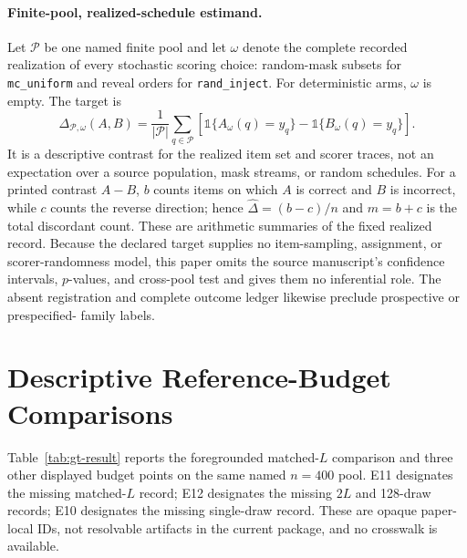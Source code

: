 \documentclass{article}
\newcommand{\rinj}{\texttt{rand\_inject}}
\newcommand{\mcu}{\texttt{mc\_uniform}}
\newcommand{\II}{\mathbb{1}}
\begin{document}
\paragraph{Finite-pool, realized-schedule estimand.}
Let $\mathcal P$ be one named finite pool and let $\omega$ denote the complete
recorded realization of every stochastic scoring choice: random-mask subsets
for \mcu{} and reveal orders for \rinj{}.  For deterministic arms, $\omega$ is
empty.  The target is
\begin{equation}
\Delta_{\mathcal P,\omega}(A,B)
=\frac{1}{|\mathcal P|}\sum_{q\in\mathcal P}
\left[\II\{A_{\omega}(q)=y_q\}-\II\{B_{\omega}(q)=y_q\}\right].
\label{eq:finite-pool-estimand}
\end{equation}
It is a descriptive contrast for the realized item set and scorer traces, not
an expectation over a source population, mask streams, or random schedules.
For a printed contrast $A-B$, $b$ counts items on which $A$ is correct and $B$
is incorrect, while $c$ counts the reverse direction; hence
$\widehat\Delta=(b-c)/n$ and $m=b+c$ is the total discordant count.  These are
arithmetic summaries of the fixed realized record.  Because the declared
target supplies no item-sampling, assignment, or scorer-randomness model, this
paper omits the source manuscript's confidence intervals, $p$-values, and
cross-pool test and gives them no inferential role.  The absent registration
and complete outcome ledger likewise preclude prospective or prespecified-
family labels.

\section{Descriptive Reference-Budget Comparisons}
\label{sec:result1}

Table~\ref{tab:gt-result} reports the foregrounded matched-$L$ comparison and
three other displayed budget points on the same named $n=400$ pool.  E11
designates the missing
matched-$L$ record; E12 designates the missing $2L$ and 128-draw records; E10
designates the missing single-draw record.  These are opaque paper-local IDs,
not resolvable artifacts in the current package, and no crosswalk is
available.
\end{document}
